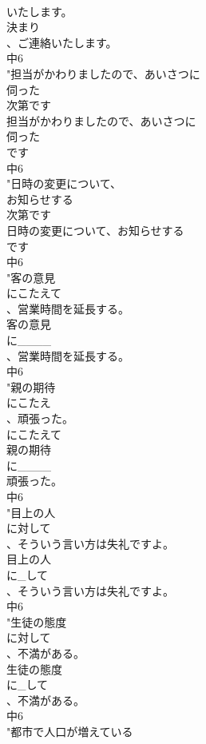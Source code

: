 \documentclass[8pt]{extreport}
\begin{document}
\begin{CJK}{UTF8}{min}
\\	いたします。
\\	決まり
\\	、ご連絡いたします。
\\	中6
\\	"担当がかわりましたので、あいさつに
\\	伺った
\\	次第です
\\	担当がかわりましたので、あいさつに
\\	伺った
\\	です
\\	中6
\\	"日時の変更について、
\\	お知らせする
\\	次第です
\\	日時の変更について、お知らせする
\\	です
\\	中6
\\	"客の意見
\\	にこたえて
\\	、営業時間を延長する。
\\	客の意見
\\	に____
\\	、営業時間を延長する。
\\	中6
\\	"親の期待
\\	にこたえ
\\	、頑張った。
\\	にこたえて
\\	親の期待
\\	に____
\\	頑張った。
\\	中6
\\	"目上の人
\\	に対して
\\	、そういう言い方は失礼ですよ。
\\	目上の人
\\	に_して
\\	、そういう言い方は失礼ですよ。
\\	中6
\\	"生徒の態度
\\	に対して
\\	、不満がある。
\\	生徒の態度
\\	に_して
\\	、不満がある。
\\	中6
\\	"都市で人口が増えている

\end{CJK}
\end{document}
